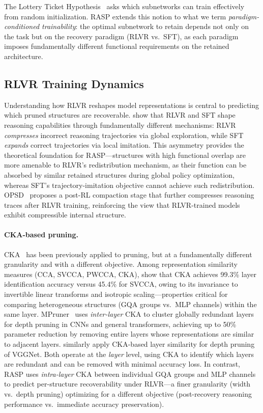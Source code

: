The Lottery Ticket Hypothesis~\citep{frankle2019lth} asks which subnetworks can train effectively from random initialization.
RASP extends this notion to what we term \emph{paradigm-conditioned trainability}: the optimal subnetwork to retain depends not only on the task but on the recovery paradigm (RLVR vs.\ SFT), as each paradigm imposes fundamentally different functional requirements on the retained architecture.

\subsection{RLVR Training Dynamics}
\label{sec:rw_rlvr}

Understanding how RLVR reshapes model representations is central to predicting which pruned structures are recoverable.
\citet{rlsqueezes2026} show that RLVR and SFT shape reasoning capabilities through fundamentally different mechanisms: RLVR \emph{compresses} incorrect reasoning trajectories via global exploration, while SFT \emph{expands} correct trajectories via local imitation.
This asymmetry provides the theoretical foundation for RASP---structures with high functional overlap are more amenable to RLVR's redistribution mechanism, as their function can be absorbed by similar retained structures during global policy optimization, whereas SFT's trajectory-imitation objective cannot achieve such redistribution.
OPSD~\citep{opsd2026} proposes a post-RL compaction stage that further compresses reasoning traces after RLVR training, reinforcing the view that RLVR-trained models exhibit compressible internal structure.

\paragraph{CKA-based pruning.}
CKA~\citep{kornblith2019cka} has been previously applied to pruning, but at a fundamentally different granularity and with a different objective.
Among representation similarity measures (CCA, SVCCA, PWCCA, CKA), \citet{klabunde_similarity_survey_2025} show that CKA achieves 99.3\% layer identification accuracy versus 45.4\% for SVCCA, owing to its invariance to invertible linear transforms and isotropic scaling---properties critical for comparing heterogeneous structures (GQA groups vs.\ MLP channels) within the same layer.
MPruner~\citep{mpruner2024} uses \emph{inter-layer} CKA to cluster globally redundant layers for depth pruning in CNNs and general transformers, achieving up to 50\% parameter reduction by removing entire layers whose representations are similar to adjacent layers.
\citet{lachance2024cka} similarly apply CKA-based layer similarity for depth pruning of VGGNet.
Both operate at the \emph{layer} level, using CKA to identify which layers are redundant and can be removed with minimal accuracy loss.
In contrast, RASP uses \emph{intra-layer} CKA between individual GQA groups and MLP channels to predict per-structure recoverability under RLVR---a finer granularity (width vs.\ depth pruning) optimizing for a different objective (post-recovery reasoning performance vs.\ immediate accuracy preservation).
